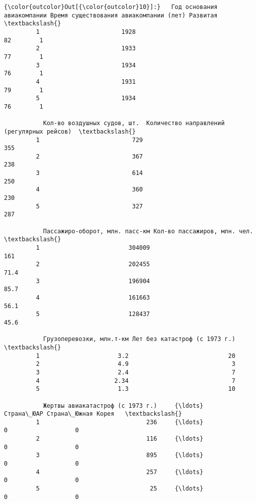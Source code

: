 \documentclass[11pt,mathletters]{article}
\begin{document}
            \begin{Verbatim}[commandchars=\\\{\}]
{\color{outcolor}Out[{\color{outcolor}10}]:}   Год основания авиакомпании Время существования авиакомпании (лет) Развитая  \textbackslash{}
         1                       1928                                     82        1   
         2                       1933                                     77        1   
         3                       1934                                     76        1   
         4                       1931                                     79        1   
         5                       1934                                     76        1   
         
           Кол-во воздушных судов, шт.  Количество направлений (регулярных рейсов)  \textbackslash{}
         1                          729                                        355   
         2                          367                                        238   
         3                          614                                        250   
         4                          360                                        230   
         5                          327                                        287   
         
           Пассажиро-оборот, млн. пасс-км Кол-во пассажиров, млн. чел.   \textbackslash{}
         1                         304009                           161   
         2                         202455                          71.4   
         3                         196904                          85.7   
         4                         161663                          56.1   
         5                         128437                          45.6   
         
           Грузоперевозки, млн.т-км Лет без катастроф (с 1973 г.)  \textbackslash{}
         1                      3.2                            20   
         2                      4.9                             3   
         3                      2.4                             7   
         4                     2.34                             7   
         5                      1.3                            10   
         
           Жертвы авиакатастроф (с 1973 г.)     {\ldots}     Страна\_ЮАР Страна\_Южная Корея   \textbackslash{}
         1                              236     {\ldots}              0                   0   
         2                              116     {\ldots}              0                   0   
         3                              895     {\ldots}              0                   0   
         4                              257     {\ldots}              0                   0   
         5                               25     {\ldots}              0                   0   
         

\end{Verbatim}
\end{document}
